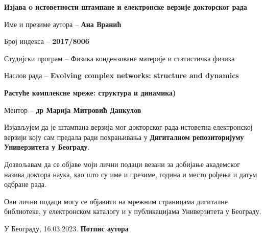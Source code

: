 \cleardoublepage

\thispagestyle{empty}
\setlength{\parindent}{0pt}
\renewcommand{\headrulewidth}{0pt}


\normalsize

\mbox{}
\vspace{1cm}

\begin{center}


\begin{Large}\textbf{Изјава o истоветности штампане и електронске верзије 
докторског рада 
}
\end{Large} 
\end{center}


\vspace{1cm}

Име и презиме аутора -- \textbf{Ана Вранић}

Број индекса -- \textbf{2017/8006}

Студијски програм --  Физика кондензоване материје и статистичка физика

Наслов рада -- 
{
\textbf{Evolving complex networks: structure and dynamics}}

\textbf{Растуће комплексне мреже: структура и динамика)}

Ментор -- \textbf{др Марија Митровић Данкулов}

Изјављујем  да  је  штампана  верзија  мог  докторског  рада  истоветна  
електронској верзији  коју  сам  предала  ради  похрањивања у \textbf{Дигиталном 
репозиторијуму Универзитета у Београду}. 

Дозвољавам да се објаве моји лични 
подаци везани за добијање академског назива доктора наука, као што су име и 
презиме, година и место рођења и датум одбране рада. 

Ови лични подаци могу се 
објавити на мрежним страницама дигиталне библиотеке, у електронском каталогу и 
у 
публикацијама Универзитета у Београду.
 

\vfill

У Београду, 16.03.2023.  \hfill  \textbf{Потпис
аутора\hspace{2cm}\mbox{}}

\vspace{.5cm}
\hspace{10cm}\hrulefill 


\hspace{\fill}


